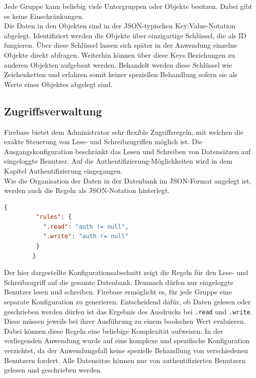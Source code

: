 Jede Gruppe kann beliebig viele Untergruppen oder Objekte besitzen. Dabei gibt es keine Einschränkungen.\\
Die Daten in den Objekten sind in der JSON-typischen Key:Value-Notation abgelegt.
Identifiziert werden die Objekte über einzigartige Schlüssel, die als ID fungieren.
Über diese Schlüssel lassen sich später in der Anwendung einzelne Objekte direkt abfragen.
Weiterhin können über diese Keys Beziehungen zu anderen Objekten aufgebaut werden.
Behandelt werden diese Schlüssel wie Zeichenketten und erfahren somit keiner speziellen Behandlung sofern sie als Werte eines Objektes abgelegt sind.

\subsection{Zugriffsverwaltung}
Firebase bietet dem Administrator sehr flexible Zugriffsregeln, mit welchen die exakte Steuerung von Lese- und Schreibzugriffen möglich ist.
Die Ausgangskonfiguration beschränkt das Lesen und Schreiben von Datensätzen auf eingeloggte Benutzer. Auf die Authentifizierung-Möglichkeiten wird in dem Kapitel Authentifizierung eingegangen.\\
Wie die Organisation der Daten in der Datenbank im JSON-Format angelegt ist, werden auch die Regeln als JSON-Notation hinterlegt.

       
       
\begin{lstlisting}[language=JSON, label=code_AccessRuleDatabase, caption=Beispiel-Konfiguration für Datenbankzugriffe]
		{
         "rules": {
           ".read": "auth != null",
           ".write": "auth != null"
         }
  		}
\end{lstlisting}

Der hier dargestellte Konfigurationsabschnitt zeigt die Regeln für den Lese- und Schreibzugriff auf die gesamte Datenbank. Demnach dürfen nur eingeloggte Benutzer lesen und schreiben. Firebase ermöglicht es, für jede Gruppe eine separate Konfiguration zu generieren.
Entscheidend dafür, ob Daten gelesen oder geschrieben werden dürfen ist das Ergebnis des Ausdrucks bei \texttt{.read} und \texttt{.write}. Diese müssen jeweils bei ihrer Ausführung zu einem boolschen Wert evaluieren. Dabei können diese Regeln eine beliebige
Komplexität aufweisen.
In der vorliegenden Anwendung wurde auf eine komplexe und spezifische Konfiguration verzichtet, da der Anwendungsfall keine spezielle Behandlung von verschiedenen Benutzern fordert.
Alle Datensätze können nur von authentifizierten Benutzern gelesen und geschrieben werden.

